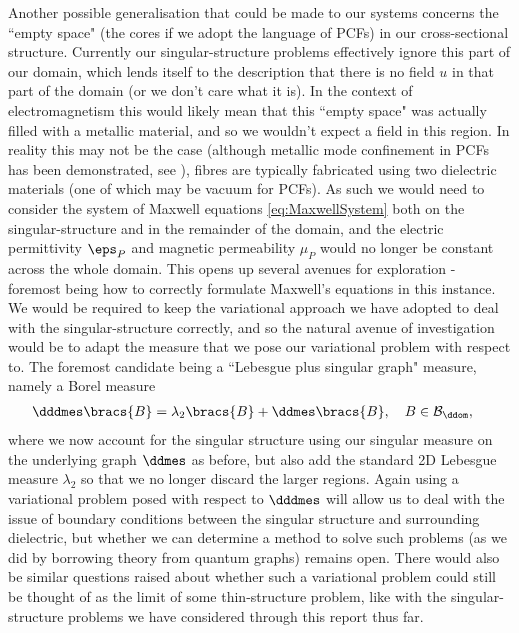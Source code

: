 Another possible generalisation that could be made to our systems concerns the ``empty space" (the cores if we adopt the language of PCFs) in our cross-sectional structure.
Currently our singular-structure problems effectively ignore this part of our domain, which lends itself to the description that there is no field $u$ in that part of the domain (or we don't care what it is).
In the context of electromagnetism this would likely mean that this ``empty space" was actually filled with a metallic material, and so we wouldn't expect a field in this region.
In reality this may not be the case (although metallic mode confinement in PCFs has been demonstrated, see \cite{hou2008metallic}), fibres are typically fabricated using two dielectric materials (one of which may be vacuum for PCFs).
As such we would need to consider the system of Maxwell equations \eqref{eq:MaxwellSystem} both on the singular-structure and in the remainder of the domain, and the electric permittivity $\eps_{P}$ and magnetic permeability $\mu_{P}$ would no longer be constant across the whole domain.
This opens up several avenues for exploration - foremost being how to correctly formulate Maxwell's equations in this instance.
We would be required to keep the variational approach we have adopted to deal with the singular-structure correctly, and so the natural avenue of investigation would be to adapt the measure that we pose our variational problem with respect to.
The foremost candidate being a ``Lebesgue plus singular graph" measure, namely a Borel measure
\begin{align*}
	\dddmes\bracs{B} &= \lambda_{2}\bracs{B} + \ddmes\bracs{B}, \quad B\in\mathcal{B}_{\ddom},
\end{align*}
where we now account for the singular structure using our singular measure on the underlying graph $\ddmes$ as before, but also add the standard 2D Lebesgue measure $\lambda_2$ so that we no longer discard the larger regions.
Again using a variational problem posed with respect to $\dddmes$ will allow us to deal with the issue of boundary conditions between the singular structure and surrounding dielectric, but whether we can determine a method to solve such problems (as we did by borrowing theory from quantum graphs) remains open.
There would also be similar questions raised about whether such a variational problem could still be thought of as the limit of some thin-structure problem, like with the singular-structure problems we have considered through this report thus far.

